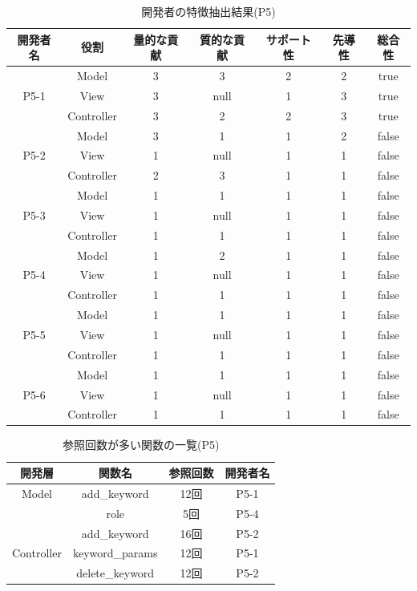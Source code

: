 \documentclass{funthesis}
\begin{document}
\begin{table}[H]
  \begin{center}
\begin{tabular}{|c|c|c|c|c|c|c|}
\hline
開発者名 & 役割 & 量的な貢献 & 質的な貢献 & サポート性 & 先導性 & 総合性\\ \hline
& Model & 3 & 3 & 2 & 2 & true\\ \cline{2-7}
P5-1 & View & 3 & null & 1 & 3 & true\\ \cline{2-7}
& Controller & 3 & 2 & 2 & 3 & true \\ \hline \hline

& Model & 3 & 1 & 1 & 2 & false\\ \cline{2-7}
P5-2 & View & 1 & null & 1 & 1 & false\\ \cline{2-7}
& Controller & 2 & 3 & 1 & 1 & false \\ \hline \hline

& Model & 1 & 1 & 1 & 1 & false\\ \cline{2-7}
P5-3 & View & 1 & null & 1 & 1 & false\\ \cline{2-7}
& Controller & 1 & 1 & 1 & 1 & false \\ \hline \hline

& Model & 1 & 2 & 1 & 1 & false\\ \cline{2-7}
P5-4 & View & 1 & null& 1 & 1 & false\\ \cline{2-7}
& Controller & 1 & 1 & 1 & 1 & false \\ \hline \hline

& Model & 1 & 1 & 1 & 1 & false\\ \cline{2-7}
P5-5 & View & 1 & null & 1 & 1 & false\\ \cline{2-7}
& Controller & 1 & 1 & 1 & 1 & false \\ \hline \hline

& Model & 1 & 1 & 1 & 1 & false\\ \cline{2-7}
P5-6 & View & 1 & null & 1 & 1 & false\\ \cline{2-7}
& Controller & 1 & 1 & 1 & 1 & false \\ \hline
\end{tabular}
  \end{center}
  \caption{開発者の特徴抽出結果(P5)}    \label{sample}
\end{table}
\begin{table}[H]
  \begin{center}
\begin{tabular}{|c|c|c|c|}\hline
開発層&関数名&参照回数&開発者名\\ \hline
Model& add\_keyword & 12回 & P5-1 \\ \cline{2-4}
& role & 5回 & P5-4 \\ \cline{2-4}\hline\hline

& add\_keyword & 16回 & P5-2 \\ \cline{2-4}
Controller& keyword\_params & 12回 & P5-1 \\ \cline{2-4}
& delete\_keyword & 12回 & P5-2 \\ \cline{2-4}\hline
\end{tabular}    
\caption{参照回数が多い関数の一覧(P5)}    \label{sample}
  \end{center}
\end{table}
\end{document}
